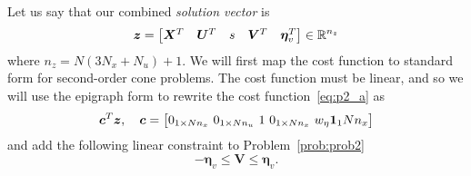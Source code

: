 \documentclass[10pt]{article}
\begin{document}
Let us say that our combined \textit{solution vector} is 
\begin{equation*}
\bm{z} = \begin{bmatrix}
\bm{X}^T & \bm{U}^T & s & \bm{V}^T & \bm{\eta}_v^T
\end{bmatrix} \in {\mathbb{R}}^{n_z}
\end{equation*}
where $n_z = N(3N_x + N_u)+1$. We will first map the cost function to standard form for second-order cone problems. The cost function must be linear, and so we will use the epigraph form to rewrite the cost function~\eqref{eq:p2_a} as
\begin{equation}
\bm{c}^T \bm{z}, \quad \bm{c} = \big[ 0_{1 \times N n_x} \ 0_{1 \times N n_u} \ 1 \ 0_{1 \times N n_x} \ w_{\eta} \bm{1}_{1}{N n_x} \big]
\label{eq:std_cost}
\end{equation}
and add the following linear constraint to Problem~\ref{prob:prob2}
\begin{equation}
- \bm{\eta}_v \leq \bm{V} \leq \bm{\eta}_v.
\label{eq:p2_epi}
\end{equation}
\end{document}

